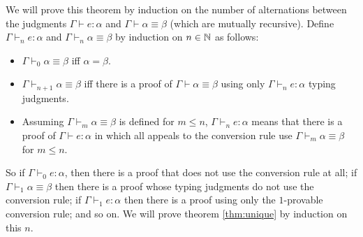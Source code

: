 We will prove this theorem by induction on the number of alternations between the judgments $\Gamma\vdash e:\alpha$ and $\Gamma\vdash\alpha\equiv\beta$ (which are mutually recursive). Define $\Gamma\vdash_n e:\alpha$ and $\Gamma\vdash_n\alpha\equiv\beta$ by induction on $n\in\mathbb{N}$ as follows:
\begin{itemize}
\item $\Gamma\vdash_0\alpha\equiv\beta$ iff $\alpha=\beta$.
\item $\Gamma\vdash_{n+1}\alpha\equiv\beta$ iff there is a proof of $\Gamma\vdash\alpha\equiv\beta$ using  only $\Gamma\vdash_n e:\alpha$ typing judgments.
\item Assuming $\Gamma\vdash_m\alpha\equiv\beta$ is defined for $m\le n$, $\Gamma\vdash_n e:\alpha$ means that there is a proof of $\Gamma\vdash e:\alpha$ in which all appeals to the conversion rule use $\Gamma\vdash_m\alpha\equiv\beta$ for $m\le n$.
\end{itemize}
So if $\Gamma\vdash_0 e:\alpha$, then there is a proof that does not use the conversion rule at all; if $\Gamma\vdash_1\alpha\equiv\beta$ then there is a proof whose typing judgments do not use the conversion rule; if $\Gamma\vdash_1 e:\alpha$ then there is a proof using only the $1$-provable conversion rule; and so on. We will prove theorem \ref{thm:unique} by induction on this $n$.

